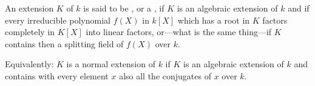 An extension $K$ of $k$ is said to be , or a , if $K$ is an algebraic extension of $k$ and if every irreducible polynomial $f(X)$ in $k[X]$ which has a root in $K$ factors completely in $K[X]$ into linear factors, or---what is the same thing---if $K$ contains then a splitting field of $f(X)$ over $k$.

Equivalently: $K$ is a normal extension of $k$ if $K$ is an algebraic extension of $k$ and contains with every element $x$ also all the conjugates of $x$ over $k$.
